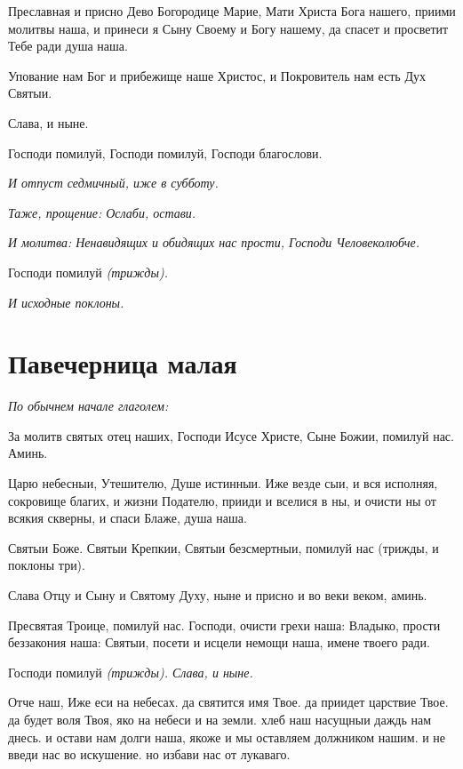 Преславная и присно Дево Богородице Марие, Мати Христа Бога нашего, приими молитвы наша, и принеси я Сыну Своему и Богу нашему, да спасет и просветит Тебе ради душа наша.


Упование нам Бог и прибежище наше Христос, и Покровитель нам есть Дух Святыи.


Слава, и ныне.


Господи помилуй, Господи помилуй, Господи благослови.


\itshape И отпуст седмичный, иже в субботу.\normalfont{}


\itshape Таже, прощение: Ослаби, остави.\normalfont{}


\itshape И молитва:\normalfont{} Ненавидящих и обидящих нас прости, Господи Человеколюбче.


Господи помилуй \itshape (трижды)\normalfont{}.


\itshape И исходные поклоны.\normalfont{}


\section{Павечерница малая}
 


\itshape По обычнем начале глаголем:\normalfont{}


За молитв святых отец наших, Господи Исусе Христе, Сыне Божии, помилуй нас. Аминь.


Царю небесныи, Утешителю, Душе истинныи. Иже везде сыи, и вся исполняя, сокровище благих, и жизни Подателю, прииди и вселися в ны, и очисти ны от всякия скверны, и спаси Блаже, душа наша.


Святыи Боже. Святыи Крепкии, Святыи безсмертныи, помилуй нас (трижды, и поклоны три).


Слава Отцу и Сыну и Святому Духу, ныне и присно и во веки веком, аминь.


Пресвятая Троице, помилуй нас. Господи, очисти грехи наша: Владыко, прости беззакония наша: Святыи, посети и исцели немощи наша, имене твоего ради.


Господи помилуй \itshape (трижды)\normalfont{}. Слава, и ныне.


Отче наш, Иже еси на небесах. да святится имя Твое. да приидет царствие Твое. да будет воля Твоя, яко на небеси и на земли. хлеб наш насущныи даждь нам днесь. и остави нам долги наша, якоже и мы оставляем должником нашим. и не введи нас во искушение. но избави нас от лукаваго.


